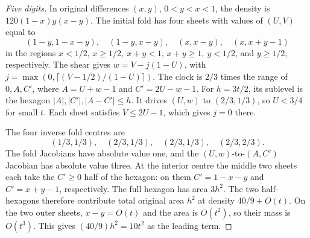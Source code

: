 \documentclass[11pt]{amsart}
\theoremstyle{definition}
\begin{document}
\begin{proof}[Five digits]
In original differences \((x,y)\), \(0<y<x<1\), the
density is \(120(1-x)y(x-y)\). The initial fold
\cite[Section~1.4]{G3} has four sheets with values of
\((U,V)\) equal to
\[
 (1-y,1-x-y),\quad (1-y,x-y),\quad
 (x,x-y),\quad (x,x+y-1)
\]
in the regions \(x<1/2\), \(x\ge1/2,\ x+y<1\),
\(x+y\ge1,\ y<1/2\), and \(y\ge1/2\), respectively.
The shear gives \(w=V-j(1-U)\), with
\(j=\max(0,\lceil(V-1/2)/(1-U)\rceil)\).
The clock is \(2/3\) times the range of \(0,A,C'\),
where \(A=U+w-1\) and \(C'=2U-w-1\).
For \(h=3t/2\), its sublevel is the hexagon
\(|A|,|C'|,|A-C'|\le h\).
It drives \((U,w)\) to \((2/3,1/3)\), so \(U<3/4\)
for small \(t\). Each sheet satisfies \(V\le2U-1\),
which gives \(j=0\) there.

The four inverse fold centres are
\[
 (1/3,1/3),\quad (2/3,1/3),\quad (2/3,1/3),\quad (2/3,2/3).
\]
The fold Jacobians have absolute value one, and the
\((U,w)\)-to-\((A,C')\) Jacobian has absolute value three.
At the interior centre the middle two sheets each take
the \(C'\ge0\) half of the hexagon: on them
\(C'=1-x-y\) and \(C'=x+y-1\), respectively.
The full hexagon has area \(3h^2\).
The two half-hexagons therefore contribute total
original area \(h^2\) at density \(40/9+O(t)\).
On the two outer sheets, \(x-y=O(t)\) and the area
is \(O(t^2)\), so their mass is \(O(t^3)\).
This gives \((40/9)h^2=10t^2\) as the leading term.
\end{proof}
\end{document}
